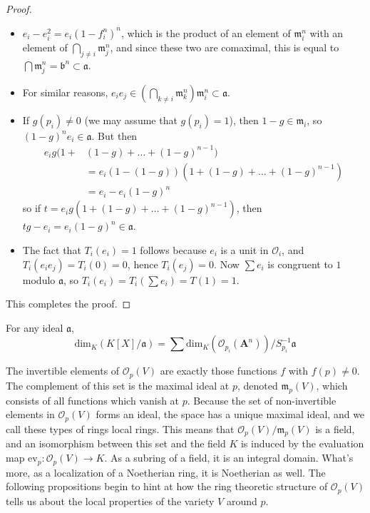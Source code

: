 \begin{proof}
\begin{itemize}
        \item $e_i - e_i^2 = e_i(1 - f_i^n)^n$, which is the product of an element of $\mathfrak{m}_i^n$ with an element of $\bigcap_{j \neq i} \mathfrak{m}_j^n$, and since these two are comaximal, this is equal to $\bigcap \mathfrak{m}_j^n = \mathfrak{b}^n \subset \mathfrak{a}$.

        \item For similar reasons, $e_ie_j \in (\bigcap_{k \neq i} \mathfrak{m}_k^n) \mathfrak{m}_i^n \subset \mathfrak{a}$.

        \item  If $g(p_i) \neq 0$ (we may assume that $g(p_i) = 1$), then $1 - g \in \mathfrak{m}_i$, so $(1-g)^n e_i \in \mathfrak{a}$. But then
    \begin{align*}
        e_i g(1 +& (1-g) + \dots + (1-g)^{n-1})\\
        &= e_i(1 - (1-g))(1 + (1-g) + \dots + (1-g)^{n-1})\\
        &= e_i - e_i (1 - g)^n
    \end{align*}
    so if $t = e_i g(1 + (1-g) + \dots + (1-g)^{n-1})$, then $tg - e_i = e_i(1-g)^n \in \mathfrak{a}$.

    \item The fact that $T_i(e_i) = 1$ follows because $e_i$ is a unit in $\mathcal{O}_i$, and $T_i(e_ie_j) = T_i(0) = 0$, hence $T_i(e_j) = 0$. Now $\sum e_i$ is congruent to $1$ modulo $\mathfrak{a}$, so $T_i(e_i) = T_i(\sum e_i) = T(1) = 1$.
    \end{itemize}
    This completes the proof.
\end{proof}

\begin{corollary}
    For any ideal $\mathfrak{a}$,
    \[ \text{dim}_K(K[X]/\mathfrak{a}) = \sum \text{dim}_K(\mathcal{O}_{p_i}(\mathbf{A}^n))/S_{p_i}^{-1} \mathfrak{a} \]
\end{corollary}

The invertible elements of $\mathcal{O}_p(V)$ are exactly those functions $f$ with $f(p) \neq 0$. The complement of this set is the maximal ideal at $p$, denoted $\mathfrak{m}_p(V)$, which consists of all functions which vanish at $p$. Because the set of non-invertible elements in $\mathcal{O}_p(V)$ forms an ideal, the space has a unique maximal ideal, and we call these types of rings local rings. This means that $\mathcal{O}_p(V)/\mathfrak{m}_p(V)$ is a field, and an isomorphism between this set and the field $K$ is induced by the evaluation map $\text{ev}_p: \mathcal{O}_p(V) \to K$. As a subring of a field, it is an integral domain. What's more, as a localization of a Noetherian ring, it is Noetherian as well. The following propositions begin to hint at how the ring theoretic structure of $\mathcal{O}_p(V)$ tells us about the local properties of the variety $V$ around $p$.

